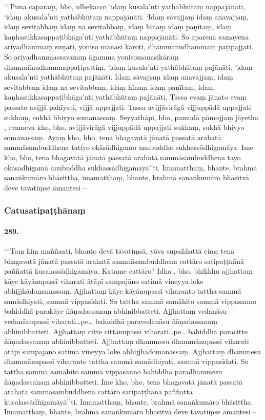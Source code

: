 ‘‘‘Puna caparaṃ, bho, idhekacco ‘idaṃ kusala’nti yathābhūtaṃ nappajānāti, ‘idaṃ akusala’nti yathābhūtaṃ nappajānāti. ‘Idaṃ sāvajjaṃ idaṃ anavajjaṃ, idaṃ sevitabbaṃ idaṃ na sevitabbaṃ, idaṃ hīnaṃ idaṃ paṇītaṃ, idaṃ kaṇhasukkasappaṭibhāga’nti yathābhūtaṃ nappajānāti. So aparena samayena ariyadhammaṃ suṇāti, yoniso manasi karoti, dhammānudhammaṃ paṭipajjati. So ariyadhammassavanaṃ āgamma yonisomanasikāraṃ dhammānudhammappaṭipattiṃ, ‘idaṃ kusala’nti yathābhūtaṃ pajānāti, ‘idaṃ akusala’nti yathābhūtaṃ pajānāti. Idaṃ sāvajjaṃ idaṃ anavajjaṃ, idaṃ sevitabbaṃ idaṃ na sevitabbaṃ, idaṃ hīnaṃ idaṃ paṇītaṃ, idaṃ kaṇhasukkasappaṭibhāga’nti yathābhūtaṃ pajānāti. Tassa evaṃ jānato evaṃ passato avijjā pahīyati, vijjā uppajjati. Tassa avijjāvirāgā vijjuppādā uppajjati sukhaṃ, sukhā bhiyyo somanassaṃ. Seyyathāpi, bho, pamudā pāmojjaṃ jāyetha , evameva kho, bho, avijjāvirāgā vijjuppādā uppajjati sukhaṃ, sukhā bhiyyo somanassaṃ. Ayaṃ kho, bho, tena bhagavatā jānatā passatā arahatā sammāsambuddhena tatiyo okāsādhigamo anubuddho sukhassādhigamāya. Ime kho, bho, tena bhagavatā jānatā passatā arahatā sammāsambuddhena tayo okāsādhigamā anubuddhā sukhassādhigamāyā’’ti. Imamatthaṃ, bhante, brahmā sanaṅkumāro bhāsittha, imamatthaṃ, bhante, brahmā sanaṅkumāro bhāsitvā deve tāvatiṃse āmantesi –

\subsubsection{Catusatipaṭṭhānaṃ}

\paragraph{289.} ‘‘‘Taṃ kiṃ maññanti, bhonto devā tāvatiṃsā, yāva supaññattā cime tena bhagavatā jānatā passatā arahatā sammāsambuddhena cattāro satipaṭṭhānā paññattā kusalassādhigamāya. Katame cattāro? Idha , bho, bhikkhu ajjhattaṃ kāye kāyānupassī viharati ātāpī sampajāno satimā vineyya loke abhijjhādomanassaṃ. Ajjhattaṃ kāye kāyānupassī viharanto tattha sammā samādhiyati, sammā vippasīdati. So tattha sammā samāhito sammā vippasanno bahiddhā parakāye ñāṇadassanaṃ abhinibbatteti. Ajjhattaṃ vedanāsu vedanānupassī viharati…pe… bahiddhā paravedanāsu ñāṇadassanaṃ abhinibbatteti. Ajjhattaṃ citte cittānupassī viharati…pe… bahiddhā paracitte ñāṇadassanaṃ abhinibbatteti. Ajjhattaṃ dhammesu dhammānupassī viharati ātāpī sampajāno satimā vineyya loke abhijjhādomanassaṃ. Ajjhattaṃ dhammesu dhammānupassī viharanto tattha sammā samādhiyati, sammā vippasīdati. So tattha sammā samāhito sammā vippasanno bahiddhā paradhammesu ñāṇadassanaṃ abhinibbatteti. Ime kho, bho, tena bhagavatā jānatā passatā arahatā sammāsambuddhena cattāro satipaṭṭhānā paññattā kusalassādhigamāyā’’ti. Imamatthaṃ, bhante, brahmā sanaṅkumāro bhāsittha. Imamatthaṃ, bhante, brahmā sanaṅkumāro bhāsitvā deve tāvatiṃse āmantesi –

